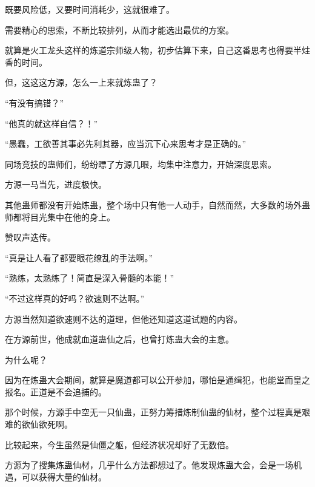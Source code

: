 \begin{this_body}
既要风险低，又要时间消耗少，这就很难了。

需要精心的思索，不断比较排列，从而才能选出最优的方案。

就算是火工龙头这样的炼道宗师级人物，初步估算下来，自己这番思考也得要半炷香的时间。

但，这这这方源，怎么一上来就炼蛊了？

“有没有搞错？”

“他真的就这样自信？！”

“愚蠢，工欲善其事必先利其器，应当沉下心来思考才是正确的。”

同场竞技的蛊师们，纷纷瞟了方源几眼，均集中注意力，开始深度思索。

方源一马当先，进度极快。

其他蛊师都没有开始炼蛊，整个场中只有他一人动手，自然而然，大多数的场外蛊师都将目光集中在他的身上。

赞叹声迭传。

“真是让人看了都要眼花缭乱的手法啊。”

“熟练，太熟练了！简直是深入骨髓的本能！”

“不过这样真的好吗？欲速则不达啊。”

方源当然知道欲速则不达的道理，但他还知道这道试题的内容。

在方源前世，他成就血道蛊仙之后，也曾打炼蛊大会的主意。

为什么呢？

因为在炼蛊大会期间，就算是魔道都可以公开参加，哪怕是通缉犯，也能堂而皇之报名。正道是不会追捕的。

那个时候，方源手中空无一只仙蛊，正努力筹措炼制仙蛊的仙材，整个过程真是艰难的欲仙欲死啊。

比较起来，今生虽然是仙僵之躯，但经济状况却好了无数倍。

方源为了搜集炼蛊仙材，几乎什么方法都想过了。他发现炼蛊大会，会是一场机遇，可以获得大量的仙材。

\end{this_body}

